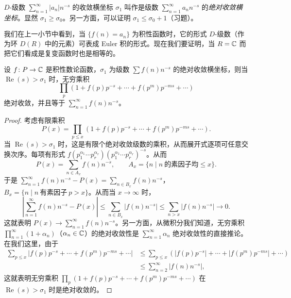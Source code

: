 \begin{definition}\label{def:ch4-2}
$D$-级数 $\sum_{n=1}^{\infty}|a_n|n^{-s}$ 的收敛横坐标 $\sigma_1$ 叫作是级数 $\sum_{n=1}^{\infty}a_nn^{-s}$ 的\emph{绝对收敛横坐标}。显然 $\sigma_1\geqslant\sigma_0$。另一方面，可以证明 $\sigma_1\leqslant\sigma_0+1$（习题）。
\end{definition}

\begin{sloppypar}
我们在上一小节中看到，当 $\{f(n)=a_n\}$ 为积性函数时，它的形式 $D$-级数（作为环 $D(R)$ 中的元素）可表成 Euler 积的形式。现在我们要证明，当 $R=\mathbb{C}$ 而把它们看成是复变函数时也是相等的。
\end{sloppypar}

\begin{theorem}\label{thm:4.3}
设 $f\colon P\to\mathbb{C}$ 是积性数论函数，$\sigma_1$ 为级数 $\sum f(n)n^{-s}$ 的绝对收敛横坐标，则当 $\operatorname{Re}(s)>\sigma_1$ 时，无穷乘积
\[
  \prod_p(1+f(p)p^{-s}+\cdots+f(p^m)p^{-ms}+\cdots)
\]
绝对收敛，并且等于 $\sum_{n=1}^{\infty}f(n)n^{-s}$。
\end{theorem}

\begin{proof}
考虑有限乘积
\[
  P(x)=\prod_{p\leqslant x}(1+f(p)p^{-s}+\cdots+f(p^m)p^{-ms}+\cdots).
\]
当 $\operatorname{Re}(s)>\sigma_1$ 时，这是有限个绝对收敛级数的乘积，从而展开式逐项可任意交换次序。每项有形式 $f(p_1^{\alpha_1}\cdots p_r^{\alpha_r})(p_1^{\alpha_1}\cdots p_r^{\alpha_r})^{-s}$。从而
\[
  P(x)=\sum_{n\in A_x}f(n)n^{-s},\qquad A_x=\{n\mid n\ \text{的素因子均}\leqslant x\}.
\]
于是 $\sum_{n=1}^{\infty}f(n)n^{-s}-P(x)=\sum_{n\in B_x}f(n)n^{-s}$，$B_x=\{n\mid n\ \text{有素因子}\ p>x\}$。从而当 $x\to\infty$ 时，
\[
  \left|\sum_{n=1}^{\infty}f(n)n^{-s}-P(x)\right|
  \leqslant\sum_{n\in B_x}|f(n)n^{-s}|
  \leqslant\sum_{n>x}|f(n)n^{-s}|\to 0.
\]
这就表明 $P(x)\to\sum_{n=1}^{\infty}f(n)n^{-s}$。另一方面，从微积分我们知道，无穷乘积 $\prod_{n=1}^{\infty}(1+\alpha_n)$（$\alpha_n\in\mathbb{C}$）的绝对收敛性是 $\sum_{n=1}^{\infty}\alpha_n$ 绝对收敛性的直接推论。在我们这里，由于
\begin{align*}
  \sum_{p\leqslant x}|f(p)p^{-s}+\cdots+f(p^m)p^{-ms}+\cdots|
  &\leqslant\sum_{p\leqslant x}(|f(p)p^{-s}|+\cdots+|f(p^m)p^{-ms}|+\cdots)\\
  &\leqslant\sum_{n=2}^{\infty}|f(n)n^{-s}|,
\end{align*}
这就表明无穷乘积 $\prod_p(1+f(p)p^{-s}+\cdots+f(p^m)p^{-ms}+\cdots)$ 在 $\operatorname{Re}(s)>\sigma_1$ 时是绝对收敛的。
\end{proof}

